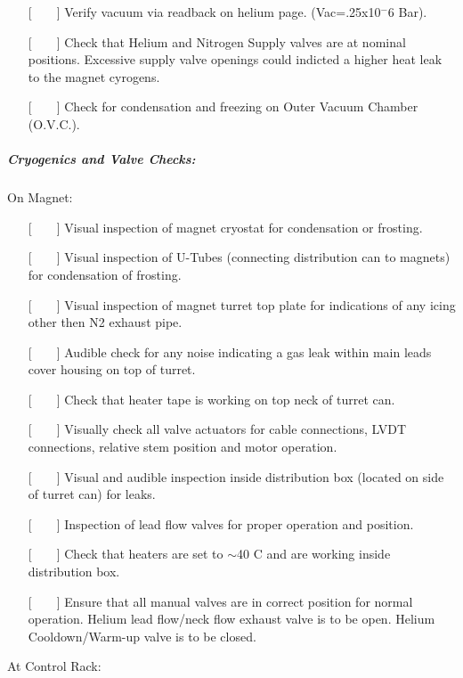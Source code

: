 \begin{itemize}
\item[{[~~~~]}]{Verify vacuum via readback on helium page.  (Vac=.25x10${^-6}$ Bar).}
\item[{[~~~~]}]{Check that Helium and Nitrogen Supply valves are at nominal
positions.  Excessive supply valve openings could indicted a higher heat
leak to the magnet cyrogens.}
\item[{[~~~~]}]{Check for condensation and freezing on Outer Vacuum
Chamber (O.V.C.).}
\end{itemize}

\subparagraph{Cryogenics and Valve Checks:}

\noindent On Magnet:

\begin{itemize}
\item[{[~~~~]}]{Visual inspection of magnet cryostat for condensation or frosting.}
\item[{[~~~~]}]{Visual inspection of U-Tubes (connecting distribution can to
magnets) for condensation of frosting.}
\item[{[~~~~]}]{Visual inspection of magnet turret top plate for indications
of any icing other then N2 exhaust pipe.}
\item[{[~~~~]}]{Audible check for any noise indicating a gas leak within main
leads cover housing on top of turret.}
\item[{[~~~~]}]{Check that heater tape is working on top neck of turret can.}
\item[{[~~~~]}]{Visually check all valve actuators for cable connections, LVDT
connections, relative stem position and motor operation.}
\item[{[~~~~]}]{Visual and audible inspection inside distribution box
(located on side of turret can) for leaks.}
\item[{[~~~~]}]{Inspection of lead flow valves for proper operation and position.}
\item[{[~~~~]}]{Check that heaters are set to $\sim$40 C and are working inside
distribution box.}
\item[{[~~~~]}]{Ensure that all manual valves are in correct position for normal
operation.  Helium lead flow/neck flow exhaust valve is to be open. Helium
Cooldown/Warm-up valve is to be closed.}
\end{itemize}

\noindent At Control Rack:

